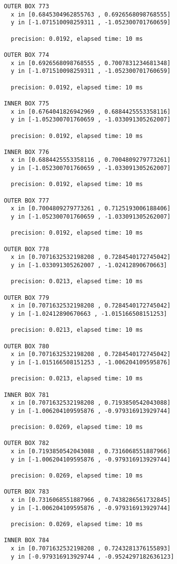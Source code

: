 \begin{verbatim}
OUTER BOX 773
  x in [0.6845304962855763 , 0.6926568098768555]
  y in [-1.071510098259311 , -1.052300701760659]

  precision: 0.0192, elapsed time: 10 ms

OUTER BOX 774
  x in [0.6926568098768555 , 0.7007831234681348]
  y in [-1.071510098259311 , -1.052300701760659]

  precision: 0.0192, elapsed time: 10 ms

INNER BOX 775
  x in [0.6764041826942969 , 0.6884425553358116]
  y in [-1.052300701760659 , -1.033091305262007]

  precision: 0.0192, elapsed time: 10 ms

INNER BOX 776
  x in [0.6884425553358116 , 0.7004809279773261]
  y in [-1.052300701760659 , -1.033091305262007]

  precision: 0.0192, elapsed time: 10 ms

OUTER BOX 777
  x in [0.7004809279773261 , 0.7125193006188406]
  y in [-1.052300701760659 , -1.033091305262007]

  precision: 0.0192, elapsed time: 10 ms

OUTER BOX 778
  x in [0.7071632532198208 , 0.7284540172745042]
  y in [-1.033091305262007 , -1.02412890670663]

  precision: 0.0213, elapsed time: 10 ms

OUTER BOX 779
  x in [0.7071632532198208 , 0.7284540172745042]
  y in [-1.02412890670663 , -1.015166508151253]

  precision: 0.0213, elapsed time: 10 ms

OUTER BOX 780
  x in [0.7071632532198208 , 0.7284540172745042]
  y in [-1.015166508151253 , -1.006204109595876]

  precision: 0.0213, elapsed time: 10 ms

INNER BOX 781
  x in [0.7071632532198208 , 0.7193850542043088]
  y in [-1.006204109595876 , -0.979316913929744]

  precision: 0.0269, elapsed time: 10 ms

OUTER BOX 782
  x in [0.7193850542043088 , 0.7316068551887966]
  y in [-1.006204109595876 , -0.979316913929744]

  precision: 0.0269, elapsed time: 10 ms

OUTER BOX 783
  x in [0.7316068551887966 , 0.7438286561732845]
  y in [-1.006204109595876 , -0.979316913929744]

  precision: 0.0269, elapsed time: 10 ms

INNER BOX 784
  x in [0.7071632532198208 , 0.7243281376155893]
  y in [-0.979316913929744 , -0.9524297182636123]


\end{verbatim}
